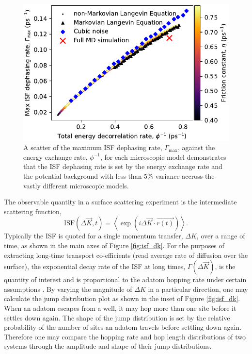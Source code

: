\documentclass[7pt]{article}
\begin{document}
\begin{figure}
	\centering
	\includegraphics[width=1.0\columnwidth]{gamma_ttf}
	\caption{A scatter of the maximum ISF dephasing rate, $\Gamma_{\text{max}}$, against the energy exchange rate, $\phi^{-1}$, for each microscopic model demonstrates that the ISF dephasing rate is set by the energy exchange rate and the potential background with less than $5\%$ variance accross the vastly different microscopic models.}
	\label{fig:gamma_ttf}
\end{figure}

The observable quantity in a surface scattering experiment is the intermediate scattering function,
$$
\mathrm{ISF}(\Delta{\vec{K}}, t) = \left<\exp\left(i\Delta{\vec{K}}\cdot\vec{r(t)}\right)\right>.
$$
Typically the ISF is quoted for a single momentum transfer, $\Delta{K}$, over a range of time, as shown in the main axes of Figure \ref{fig:isf_dk}. For the purposes of extracting long-time transport co-efficients (read average rate of diffusion over the surface), the exponential decay rate of the ISF at long times, $\Gamma(\Delta{\vec{K}})$, is the quantity of interest and is proportional to the adatom hopping rate under certain assumptions \cite{Chudley}. By varying the magnitude of $\Delta{K}$ in a particular direction, one may calculate the jump distribution plot as shown in the inset of Figure \ref{fig:isf_dk}. When an adatom escapes from a well, it may hop more than one site before it settles down again. The shape of the jump distribution is set by the relative probability of the number of sites an adatom travels before settling down again. Therefore one may compare the hopping rate and hop length distributions of two systems through the amplitude and shape of their jump distributions.
\end{document}
